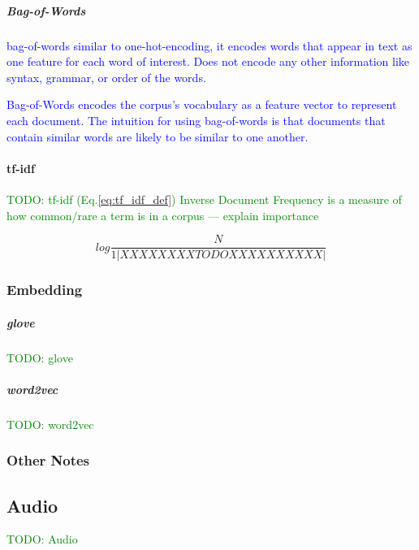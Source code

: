 \subparagraph{Bag-of-Words}

\textcolor{blue}{{bag-of-words} similar to one-hot-encoding, it encodes words that appear in text as one feature for each word of interest. Does not encode any other information like syntax, grammar, or order of the words.}

\textcolor{blue}{Bag-of-Words encodes the corpus's vocabulary as a feature vector to represent each document. The intuition for using bag-of-words is that documents that contain similar words are likely to be similar to one another.}


\paragraph{tf-idf}

\textcolor{green}{TODO: tf-idf (Eq.\ref{eq:tf_idf_def}) Inverse Document Frequency is a measure of how common/rare a term is in a corpus --- explain importance}

\begin{equation}
{log\frac{N}{1|XXXXXXXXTODOXXXXXXXXXX|}}
\label{eq:tf_idf_def}
\end{equation}

\subsubsection{Embedding}

\subparagraph{glove}

\textcolor{green}{TODO: glove}

\subparagraph{word2vec}

\textcolor{green}{TODO: word2vec}

\subsubsection{Other Notes}


\subsection{Audio}


\textcolor{green}{TODO: Audio}
